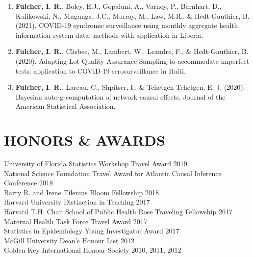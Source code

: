 \documentclass[12pt]{article}
\begin{document}
\begin{enumerate}
	\setcounter{enumi}{0}
	
	
\item \textbf{Fulcher, I. R.}, Boley, E.J., Gopaluni, A., Varney, P., Barnhart, D., Kulikowski, N., Mugunga, J.C., Murray, M., Law, M.R., \& Hedt-Gauthier, B. (2021).  COVID-19 syndromic surveillance using monthly aggregate health information system data: methods with application in Liberia. 
	
\item \textbf{Fulcher, I. R.}, Clisbee, M., Lambert, W., Leandre, F., \& Hedt-Gauthier, B. (2020).  Adapting Lot Quality Assurance Sampling to accommodate imperfect tests: application to COVID-19 serosurveillance in Haiti. 

\item  \textbf{Fulcher, I. R.}, Lareau, C., Shpitser, I., \& Tchetgen Tchetgen, E. J. (2020). Bayesian auto-g-computation of network causal effects. Journal of the American Statistical Association.  

\end{enumerate}



\section*{\textbf{{\large H}{ONORS} {\large \&} {\large A}{WARDS}}}
University of Florida Statistics Workshop Travel Award \hfill \hfill 2019 \\
National Science Foundation Travel Award for Atlantic Causal Inference Conference \hfill \hfill	2018 \\
Barry R. and Irene Tilenius Bloom Fellowship \hfill \hfill	2018 \\
Harvard University Distinction in Teaching \hfill \hfill 2017 \\
Harvard T.H. Chan School of Public Health Rose Traveling Fellowship \hfill \hfill	2017 \\
Maternal Health Task Force Travel Award \hfill \hfill	2017 \\
Statistics in Epidemiology Young Investigator Award  \hfill \hfill	2017 \\
McGill University Dean's Honour List  \hfill \hfill	2012 \\
Golden Key International Honour Society  \hfill \hfill2010, 2011, 2012 

\end{document}
